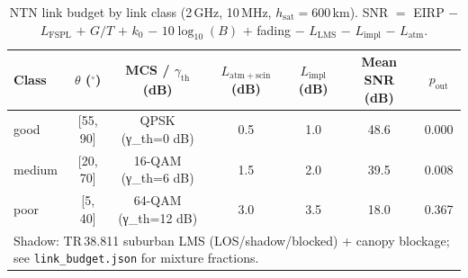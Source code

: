 \begin{table}[t]
\centering
\caption{NTN link budget by link class (2\,GHz, 10\,MHz, $h_{\mathrm{sat}}=600$\,km). SNR $=$ EIRP $-$ $L_{\mathrm{FSPL}}$ $+$ $G/T$ $+$ $k_0$ $-$ $10\log_{10}(B)$ $+$ fading $-$ $L_{\mathrm{LMS}}$ $-$ $L_{\mathrm{impl}}$ $-$ $L_{\mathrm{atm}}$.}
\label{tab:link_budget}
\begin{tabular}{lcccccc}
\toprule
Class & $\theta$ ($^\circ$) & MCS / $\gamma_{\mathrm{th}}$ (dB) & $L_{\mathrm{atm+scin}}$ (dB) & $L_{\mathrm{impl}}$ (dB) & Mean SNR (dB) & $p_{\mathrm{out}}$ \\
\midrule
good & [55, 90] & QPSK (γ_th=0 dB) & 0.5 & 1.0 & 48.6 & 0.000 \\
medium & [20, 70] & 16-QAM (γ_th=6 dB) & 1.5 & 2.0 & 39.5 & 0.008 \\
poor & [5, 40] & 64-QAM (γ_th=12 dB) & 3.0 & 3.5 & 18.0 & 0.367 \\
\midrule
\multicolumn{7}{l}{\footnotesize Shadow: TR\,38.811 suburban LMS (LOS/shadow/blocked) + canopy blockage; see \texttt{link\_budget.json} for mixture fractions.} \\
\bottomrule
\end{tabular}
\end{table}